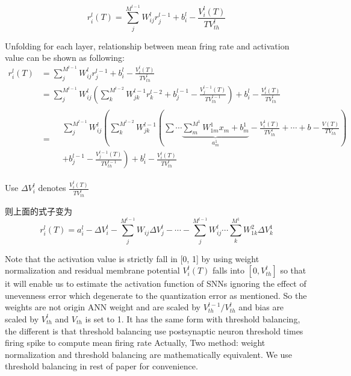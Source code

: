 \documentclass{article}
\begin{document}
\begin{equation}
  r_i^l(T) = \sum_j^{M^{l-1}}W_{ij}^lr_j^{l-1}+b_i^l - \frac{V_i^l(T)}{TV_{th}^{l}}
\end{equation}

Unfolding for each layer, relationship between mean fring rate and activation value can be shown as following:
\begin{equation}
  \begin{aligned}
    r_i^l(T) &=\sum_j^{M^{l-1}}W_{ij}^lr_j^{l-1}+b_i^l - \frac{V_i^l(T)}{TV_{th}^{l}} \\
    &= \sum_j^{M^{l-1}}W_{ij}^l\left(\sum_k^{M^{l-2}}W_{jk}^{l-1}r_k^{l-2}+b_j^{l-1} - \frac{V_j^{l-1}(T)}{TV_{th}^{l-1}} \right) + b_i^l - \frac{V_i^{l}(T)}{TV_{th}^{l}}\\
    &= \begin{split}
        & \sum_j^{M^{l-1}}W_{ij}^l\left(\sum_k^{M^{l-2}}W_{jk}^{l-1}\left(\sum\cdots \underbrace{\sum_m^{M^{1}}W_{1m}^1x_m+b_m^1}_{a_m^1} - \frac{V_i^1(T)}{TV_{th}^{1}} + \cdots + b - \frac{V(T)}{TV_{th}} \right) \right.\\ 
        &\left. + b_j^{l-1} - \frac{V_j^{l-1}(T)}{TV_{th}^{l-1}} \right) + b_i^l - \frac{V_i^{l}(T)}{TV_{th}^l}
    \end{split}
\end{aligned}
\end{equation}

Use $\Delta V_i^l$ denotes $\frac{V_i^{l}(T)}{TV_{th}^l}$

则上面的式子变为
\begin{equation}
    r_i^l(T) = a_i^l - \Delta V_i^l - \sum_j^{M^{l-1}}W_{ij}\Delta V_j^l - \cdots -\sum_j^{M^{l-1}}W_{ij}^l \cdots \sum_k^{M^{1}}W_{1k}^2 \Delta V_k^1
\end{equation}

Note that the activation value is strictly fall in [0, 1] by using weight normalization and residual membrane potential $V_i^l(T)$ falls into $[0, V_{th}^l]$ so that it will enable us to estimate the activation function of SNNs ignoring the effect
of unevenness error which degenerate to the quantization error as \cite{bu2021optimal} mentioned.
So the weights are not origin ANN weight and are scaled by $V_{th}^{l-1}/V_{th}^l$ and bias are scaled by $V_{th}^l$ and $V_{th}$ is set to 1.
It has the same form with threshold balancing, the different is that threshold balancing use postsynaptic neuron threshold times firing spike to compute mean firing rate
Actually, Two method: weight normalization and threshold balancing are mathematically equivalent. We use threshold balancing in rest of paper for convenience.
\end{document}
